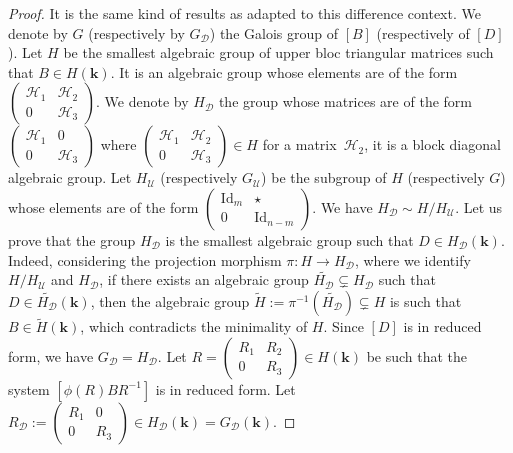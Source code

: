 \documentclass[a4paper,11pt]{amsart}
\newcommand{\Gdiag}{G_{\mathcal{D}}}
\newcommand{\Hdiag}{H_{\mathcal{D}}}
\newcommand{\Gunip}{G_{\mathcal{U}}}
\newcommand{\Hunip}{H_{\mathcal{U}}}
\def\k{\mathbf{k}}
\begin{document}
\begin{proof}
It is the same kind of results as  \cite[Theorem 2.4]{dreyfus2019computing} adapted to this difference context.  We denote by $G$ (respectively by $\Gdiag$) the Galois group of $[B]$  (respectively of $[D]$). Let $H$ be the smallest algebraic group of upper bloc triangular matrices such that $B\in H(\k)$. It is an algebraic group whose elements are of the form $\begin{pmatrix} \mathscr{H}_1 & \mathscr{H}_2 \\ 0 & \mathscr{H}_3 \end{pmatrix}$. We denote by $\Hdiag$ the group whose matrices are of the form $\begin{pmatrix} \mathscr{H}_1 & 0\\ 0 & \mathscr{H}_3 \end{pmatrix} $ where $\begin{pmatrix} \mathscr{H}_1 & \mathscr{H}_2\\ 0 & \mathscr{H}_3 \end{pmatrix}\in H $ for a matrix~$\mathscr{H}_2$, it is a block diagonal algebraic group.
Let $\Hunip$ (respectively $\Gunip$) be the subgroup of $H$ (respectively $G$) whose elements are of the form $\begin{pmatrix}
\mathrm{Id}_m & \star \\ 0 & \mathrm{Id}_{n-m}
\end{pmatrix}$. We have $\Hdiag\sim H/\Hunip$. 
Let us prove that the group $\Hdiag$ is the smallest algebraic group 
such that $D\in \Hdiag (\k)$. Indeed, considering the projection morphism $ \pi : H \rightarrow  \Hdiag$, where we identify $H/\Hunip$ and $\Hdiag$, if there exists an algebraic group $\widetilde{\Hdiag}\subsetneq \Hdiag$ such that $D\in \widetilde{\Hdiag}(\k)$, then the algebraic group  $\widetilde{H}:=\pi^{-1}(\widetilde{\Hdiag})\subsetneq H$ is such that $B\in \widetilde{H}(\k)$, which contradicts the minimality of $H$.
  Since $[D]$ is in reduced form,   we have  $\Gdiag= \Hdiag$.  
Let $R = \begin{pmatrix} R_1 & R_2 \\ 0 & R_3 \end{pmatrix}\in H(\k)$ be such that the system $\left[\phi(R)BR^{-1}\right]$ is in reduced form. Let $R_{\mathcal{D}} :=\begin{pmatrix} R_1 & 0 \\ 0 & R_3 \end{pmatrix} \in \Hdiag(\k)=\Gdiag(\k)$.   


\end{proof}
\end{document}

